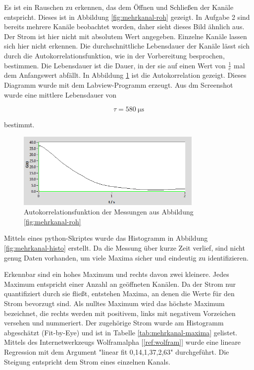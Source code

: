 \documentclass[a4paper,ngerman]{scrartcl}
\begin{document}
Es ist ein Rauschen zu erkennen, das dem Öffnen und Schließen der Kanäle entspricht. Dieses ist in Abbildung \ref{fig:mehrkanal-roh} gezeigt. In Aufgabe 2 sind bereits mehrere Kanäle beobachtet worden, daher sieht dieses Bild ähnlich aus. Der Strom ist hier nicht mit absolutem Wert angegeben. Einzelne Kanäle lassen sich hier nicht erkennen. Die durchschnittliche Lebensdauer der Kanäle lässt sich durch die Autokorrelationsfunktion, wie in der Vorbereitung besprochen, bestimmen. Die Lebensdauer ist die Dauer, in der sie auf einen Wert von $\frac{1}{e}$ mal dem Anfangswert abfällt. In Abbildung \ref{fig:mehrkanal-korrel} ist die Autokorrelation gezeigt. Dieses Diagramm wurde mit dem Labview-Programm erzeugt. Aus dm Screenshot wurde eine mittlere Lebensdauer von

\begin{equation}
\label{eqn:tau_mehrkanal}
\tau = \SI{580}{\micro\s}
\end{equation}

bestimmt.

\begin{figure}[tbh!]
\includegraphics[width=0.8\textwidth]{abbildungen/mehrkanal_korrel.png}
\caption{Autokorrelationsfunktion der Messungen aus Abbildung \ref{fig:mehrkanal-roh}}
\label{fig:mehrkanal-korrel}
\end{figure}

Mittels eines python-Skriptes wurde das Histogramm in Abbildung \ref{fig:mehrkanal-histo} erstellt. Da die Messung über kurze Zeit verlief, sind nicht genug Daten vorhanden, um viele Maxima sicher und eindeutig zu identifizieren. 

Erkennbar sind ein hohes Maximum und rechts davon zwei kleinere. 
Jedes Maximum entspricht einer Anzahl an geöffneten Kanälen. Da der Strom nur quantifiziert durch sie fließt, entstehen Maxima, an denen die Werte für den Strom bevorzugt sind.
Als nulltes Maximum wird das höchste Maximum bezeichnet, die rechts werden mit positivem, links mit negativem Vorzeichen versehen und nummeriert. 
Der zugehörige Strom wurde am Histogramm abgeschätzt (Fit-by-Eye) und ist in Tabelle \ref{tab:mehrkanal-maxima} gelistet. Mittels des Internetwerkzeugs Wolframalpha [\ref{ref:wolfram}] wurde eine lineare Regression mit dem Argument "linear fit {0,14},{1,37},{2,63}" durchgeführt. Die Steigung entspricht dem Strom eines einzelnen Kanals. 
\end{document}
